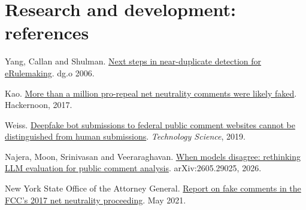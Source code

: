 \documentclass[11pt]{article}
\begin{document}
\section*{Research and development: references}
{\footnotesize
\begin{enumerate}[label={[\arabic*]}]
  \item Yang, Callan and Shulman. \href{https://www.cs.cmu.edu/~callan/Papers/dgo06-huiyang.pdf}{Next steps in near-duplicate detection for eRulemaking}. dg.o 2006.
  \item Kao. \href{https://hackernoon.com/more-than-a-million-pro-repeal-net-neutrality-comments-were-likely-faked-e9f0e3ed36a6}{More than a million pro-repeal net neutrality comments were likely faked}. Hackernoon, 2017.
  \item Weiss. \href{https://techscience.org/a/2019121801/}{Deepfake bot submissions to federal public comment websites cannot be distinguished from human submissions}. \emph{Technology Science}, 2019.
  \item Najera, Moon, Srinivasan and Veeraraghavan. \href{https://arxiv.org/abs/2605.29025}{When models disagree: rethinking LLM evaluation for public comment analysis}. arXiv:2605.29025, 2026.
  \item New York State Office of the Attorney General. \href{https://ag.ny.gov/press-release/2021/attorney-general-james-issues-report-detailing-millions-fake-comments-revealing}{Report on fake comments in the FCC's 2017 net neutrality proceeding}. May 2021.
\end{enumerate}
}
\end{document}
